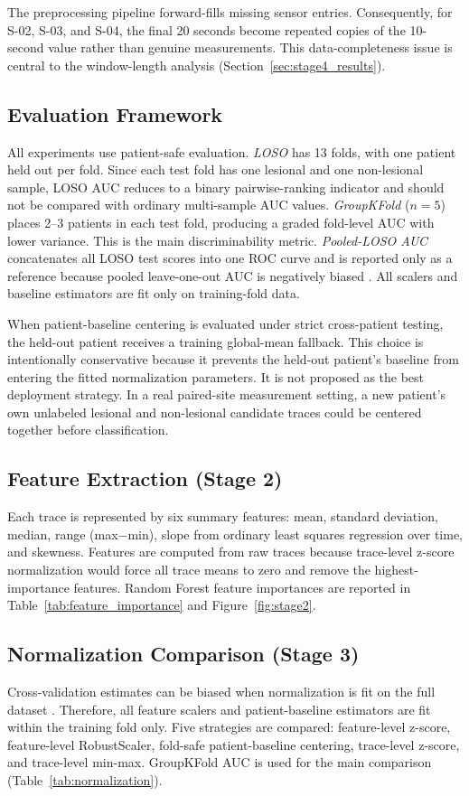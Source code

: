 \documentclass[acmtog]{acmart}
\begin{document}
The preprocessing pipeline forward-fills missing sensor entries. Consequently,
for S-02, S-03, and S-04, the final 20 seconds become repeated copies of the
10-second value rather than genuine measurements. This data-completeness issue
is central to the window-length analysis (Section~\ref{sec:stage4_results}).


\subsection{Evaluation Framework}\label{sec:eval}
All experiments use patient-safe evaluation. \textit{LOSO} has 13 folds, with
one patient held out per fold. Since each test fold has one lesional and one
non-lesional sample, LOSO AUC reduces to a binary pairwise-ranking indicator and
should not be compared with ordinary multi-sample AUC values. \textit{GroupKFold}
($n{=}5$) places 2--3 patients in each test fold, producing a graded fold-level
AUC with lower variance. This is the main discriminability metric.
\textit{Pooled-LOSO AUC} concatenates all LOSO test scores into one ROC curve
and is reported only as a reference because pooled leave-one-out AUC is
negatively biased \cite{airola2011comparison}. All scalers and baseline
estimators are fit only on training-fold data.

When patient-baseline centering is evaluated under strict cross-patient testing,
the held-out patient receives a training global-mean fallback. This choice is
intentionally conservative because it prevents the held-out patient's baseline
from entering the fitted normalization parameters. It is not proposed as the
best deployment strategy. In a real paired-site measurement setting, a new
patient's own unlabeled lesional and non-lesional candidate traces could be
centered together before classification.

\subsection{Feature Extraction (Stage 2)}
Each trace is represented by six summary features: mean, standard deviation,
median, range (max$-$min), slope from ordinary least squares regression over
time, and skewness. Features are computed from raw traces because trace-level
z-score normalization would force all trace means to zero and remove the
highest-importance features. Random Forest feature importances are reported in
Table~\ref{tab:feature_importance} and Figure~\ref{fig:stage2}.

\subsection{Normalization Comparison (Stage 3)}
Cross-validation estimates can be biased when normalization is fit on the full
dataset \cite{forman2010apples}. Therefore, all feature scalers and
patient-baseline estimators are fit within the training fold only. Five
strategies are compared: feature-level z-score, feature-level RobustScaler,
fold-safe patient-baseline centering, trace-level z-score, and trace-level
min-max. GroupKFold AUC is used for the main comparison
(Table~\ref{tab:normalization}).
\end{document}
